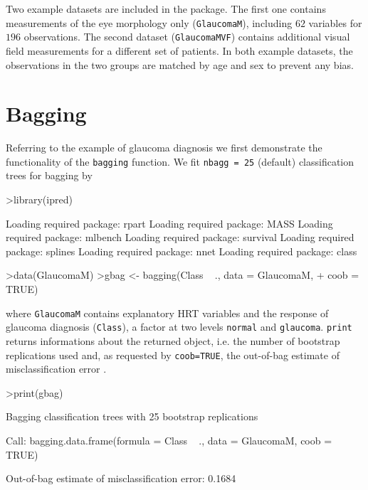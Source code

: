 \documentclass[11pt]{article}
\begin{document}
Two example datasets are included in the package. The first one contains
measurements of the eye morphology only (\texttt{GlaucomaM}), including $62$
variables for $196$ observations. The second dataset (\texttt{GlaucomaMVF})
contains additional visual field measurements for a different set of
patients. In both example datasets, the observations in the two groups are
matched by age and sex to prevent any bias.

\section{Bagging}
Referring to the example of glaucoma diagnosis we first 
demonstrate the functionality of the \texttt{bagging} function. 
We fit \texttt{nbagg = 25} (default) classification trees for bagging by 
\begin{Schunk}
\begin{Sinput}
>library(ipred)
\end{Sinput}
\begin{Soutput}
Loading required package: rpart 
Loading required package: MASS 
Loading required package: mlbench 
Loading required package: survival 
Loading required package: splines 
Loading required package: nnet 
Loading required package: class 
\end{Soutput}
\begin{Sinput}
>data(GlaucomaM)
>gbag <- bagging(Class ~ ., data = GlaucomaM, 
+     coob = TRUE)
\end{Sinput}
\end{Schunk}
where \texttt{GlaucomaM} contains explanatory HRT variables 
and the response of glaucoma diagnosis (\texttt{Class}), 
a factor at two levels \texttt{normal} and \texttt{glaucoma}.
\texttt{print} returns informations about the returned object,
i.e. the number of bootstrap replications used and, as requested by
\texttt{coob=TRUE}, the out-of-bag estimate of misclassification error 
\citep{out-of-bag:1996}. 
\begin{Schunk}
\begin{Sinput}
>print(gbag)
\end{Sinput}
\begin{Soutput}
Bagging classification trees with 25 bootstrap replications 

Call: bagging.data.frame(formula = Class ~ ., data = GlaucomaM, coob = TRUE)

Out-of-bag estimate of misclassification error:  0.1684 
\end{Soutput}
\end{Schunk}
\end{document}
